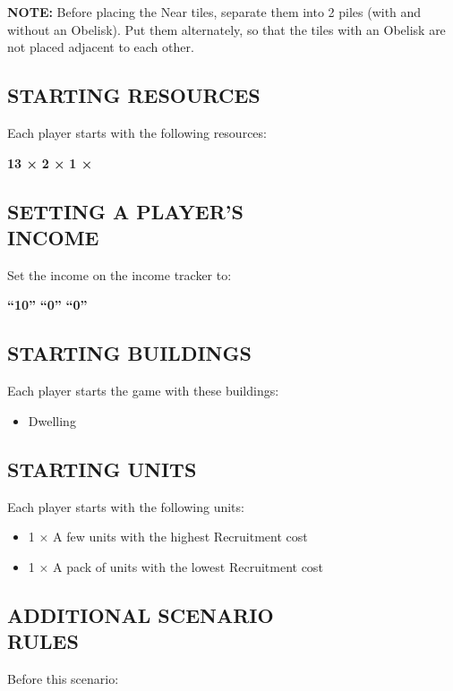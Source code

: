 \begin{multicols*}{2}
\textbf{\MakeUppercase{Note:}} Before placing the Near tiles, separate them into 2 piles (with and without an Obelisk). Put them alternately, so that the tiles with an Obelisk are not placed adjacent to each other.

\subsection*{\MakeUppercase{Starting Resources}}
Each player starts with the following resources:

{\centering\hfill \textbf{13 ×}  \hfill \textbf{2 ×}  \hfill \textbf{1 ×} \hfill}

\subsection*{\MakeUppercase{Setting a Player's\\Income}}
Set the income on the income tracker to:

{\centering\hfill\textbf{``10''}  \hfill \textbf{``0''}  \hfill \textbf{``0''} \hfill}

\subsection*{\MakeUppercase{Starting Buildings}}
Each player starts the game with these buildings:

\begin{itemize}
    \item {} Dwelling
\end{itemize}

\subsection*{\MakeUppercase{Starting Units}}
Each player starts with the following units:

\begin{itemize}
    \item 1 × A few  units with the highest Recruitment cost
    \item 1 × A pack of  units with the lowest Recruitment cost
\end{itemize}

\subsection*{\MakeUppercase{Additional Scenario\\Rules}}
Before this scenario:


\end{multicols*}
